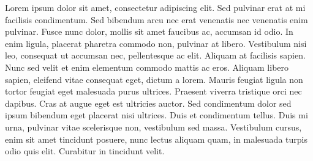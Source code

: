 \documentclass[11pt,a4paper]{article}
\begin{document}
Lorem ipsum dolor sit amet, consectetur adipiscing elit. Sed pulvinar erat at mi facilisis condimentum. Sed bibendum arcu nec erat venenatis nec venenatis enim pulvinar. Fusce nunc dolor, mollis sit amet faucibus ac, accumsan id odio. In enim ligula, placerat pharetra commodo non, pulvinar at libero. Vestibulum nisi leo, consequat ut accumsan nec, pellentesque ac elit. Aliquam at facilisis sapien. Nunc sed velit et enim elementum commodo mattis ac eros. Aliquam libero sapien, eleifend vitae consequat eget, dictum a lorem. Mauris feugiat ligula non tortor feugiat eget malesuada purus ultrices. Praesent viverra tristique orci nec dapibus. Cras at augue eget est ultricies auctor. Sed condimentum dolor sed ipsum bibendum eget placerat nisi ultrices. Duis et condimentum tellus. Duis mi urna, pulvinar vitae scelerisque non, vestibulum sed massa. Vestibulum cursus, enim sit amet tincidunt posuere, nunc lectus aliquam quam, in malesuada turpis odio quis elit. Curabitur in tincidunt velit.
\end{document}
